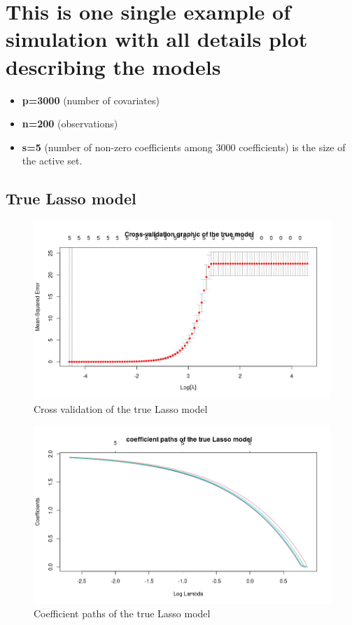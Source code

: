 \documentclass{report}
\begin{document}
\section*{ This is one single example of simulation with all details plot describing the models }
\begin{itemize}
    \item \textbf{p=3000} (number of covariates)
    \item \textbf{n=200} (observations)
    \item  \textbf{s=5} (number of non-zero coefficients among 3000 coefficients) is the size of the active set.
\end{itemize}
\subsection*{True Lasso model}

\begin{figure}[H]
	\centering
		\includegraphics[scale=0.5]{pictures/cvtl.png}
	\caption{Cross validation of the true Lasso model}
	\label{t1}
\end{figure}

\begin{figure}[H]
	\centering
		\includegraphics[scale=0.4]{pictures/ptl.png}
	\caption{Coefficient paths of the true Lasso model}
	\label{t2}
\end{figure}
\end{document}
